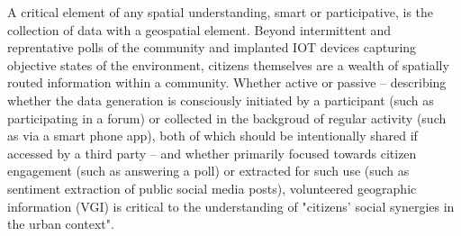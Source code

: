A critical element of any spatial understanding, smart or participative, is the collection of data with a geospatial element. Beyond intermittent and reprentative polls of the community and implanted IOT devices capturing objective states of the environment, citizens themselves are a wealth of spatially routed information within a community\cite{Roche2012}. %
Whether active or passive -- describing whether the data generation is consciously initiated by a participant (such as participating in a forum) or collected in the backgroud of regular activity (such as via a smart phone app), both of which should be intentionally shared if accessed by a third party -- and whether primarily focused towards citizen engagement (such as answering a poll) or extracted for such use (such as sentiment extraction of public social media posts), volunteered geographic information (VGI) is critical to the understanding of "citizens' social synergies in the urban context"\cite{Acedo2019, Evans-Cowley2010}. %
